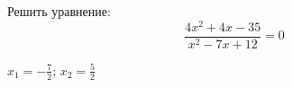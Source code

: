 \begin{ex}
	Решить уравнение:
	$$ \dfrac{4x^2+4x-35}{x^2-7x+12}=0 $$
	\begin{answer}
		$x_1=-\frac{7}{2}$; $x_2=\frac{5}{2}$
	\end{answer}
\end{ex}